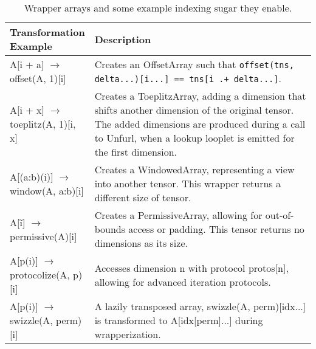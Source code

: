     \begin{table}[h]
        \centering
        \begin{tabular}{|>{\raggedright\arraybackslash}p{0.2\linewidth}|>{\raggedright\arraybackslash}p{0.8\linewidth}|}
        \hline
        \textbf{Transformation Example} & \textbf{Description} \\
        \hline
        A[i + a] $\rightarrow$ offset(A, 1)[i] & Creates an OffsetArray such that \texttt{offset(tns, delta...)[i...] == tns[i .+ delta...]}. \\
        \hline
        A[i + x] $\rightarrow$ toeplitz(A, 1)[i, x] & Creates a ToeplitzArray, adding a dimension that shifts another dimension of the original tensor. The added dimensions are produced during a call to Unfurl, when a lookup looplet is emitted for the first dimension. \\
        \hline
        A[(a:b)(i)] $\rightarrow$ window(A, a:b)[i] & Creates a WindowedArray, representing a view into another tensor. This wrapper returns a different size of tensor. \\
        \hline
        A[\~i] $\rightarrow$ permissive(A)[i] & Creates a PermissiveArray, allowing for out-of-bounds access or padding. This tensor returns no dimensions as its size. \\
        \hline
        A[p(i)] $\rightarrow$ protocolize(A, p)[i] & Accesses dimension n with protocol protos[n], allowing for advanced iteration protocols. \\
        \hline
        A[p(i)] $\rightarrow$ swizzle(A, perm)[i] & A lazily transposed array, swizzle(A, perm)[idx...] is transformed to A[idx[perm]...] during wrapperization. \\
        \hline
        \end{tabular}
        \caption{Wrapper arrays and some example indexing sugar they enable.}
    \label{table:wrappers}
    \end{table}

